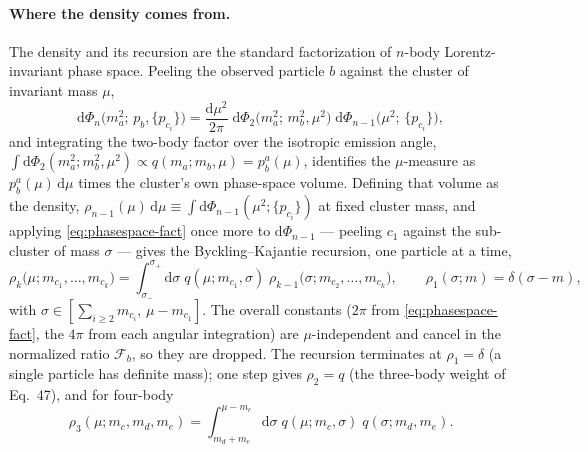 \documentclass[11pt]{article}
\newcommand{\Fb}{\mathcal{F}_b}
\begin{document}
\paragraph{Where the density comes from.}
The density and its recursion are the standard factorization of $n$-body
Lorentz-invariant phase space.  Peeling the observed particle $b$ against
the cluster of invariant mass $\mu$,
\begin{equation}
\mathrm{d}\Phi_n\big(m_a^2;\,p_b,\{p_{c_i}\}\big)
=\frac{\mathrm{d}\mu^2}{2\pi}\;
\mathrm{d}\Phi_2\big(m_a^2;\,m_b^2,\mu^2\big)\;
\mathrm{d}\Phi_{n-1}\big(\mu^2;\,\{p_{c_i}\}\big),
\label{eq:phasespace-fact}
\end{equation}
and integrating the two-body factor over the isotropic emission angle,
$\int\mathrm{d}\Phi_2(m_a^2;m_b^2,\mu^2)\propto q(m_a;m_b,\mu)=p^a_b(\mu)$,
identifies the $\mu$-measure as $p^a_b(\mu)\,\mathrm{d}\mu$ times the
cluster's own phase-space volume.  Defining that volume as the density,
$\rho_{n-1}(\mu)\,\mathrm{d}\mu\equiv\int\mathrm{d}\Phi_{n-1}(\mu^2;\{p_{c_i}\})$
at fixed cluster mass, and applying \eqref{eq:phasespace-fact} once more to
$\mathrm{d}\Phi_{n-1}$ --- peeling $c_1$ against the sub-cluster of mass
$\sigma$ --- gives the Byckling--Kajantie recursion, one particle at a time,
\begin{equation}
\rho_{k}\big(\mu;m_{c_1},\dots,m_{c_k}\big)
=\int_{\sigma_-}^{\sigma_+}\!\mathrm{d}\sigma\;
q(\mu;m_{c_1},\sigma)\;\rho_{k-1}\big(\sigma;m_{c_2},\dots,m_{c_k}\big),
\qquad
\rho_1(\sigma;m)=\delta(\sigma-m),
\label{eq:phasespace-recursion}
\end{equation}
with $\sigma\in[\sum_{i\ge2}m_{c_i},\,\mu-m_{c_1}]$.  The overall constants
($2\pi$ from \eqref{eq:phasespace-fact}, the $4\pi$ from each angular
integration) are $\mu$-independent and cancel in the normalized ratio
$\Fb$, so they are dropped.  The recursion terminates at $\rho_1=\delta$ (a
single particle has definite mass); one step gives $\rho_2=q$ (the
three-body weight of Eq.~47), and for four-body
\begin{equation}
\rho_3(\mu;m_c,m_d,m_e)
=\int_{m_d+m_e}^{\mu-m_c}\!\mathrm{d}\sigma\;
q(\mu;m_c,\sigma)\;q(\sigma;m_d,m_e).
\label{eq:rho3}
\end{equation}
\end{document}
